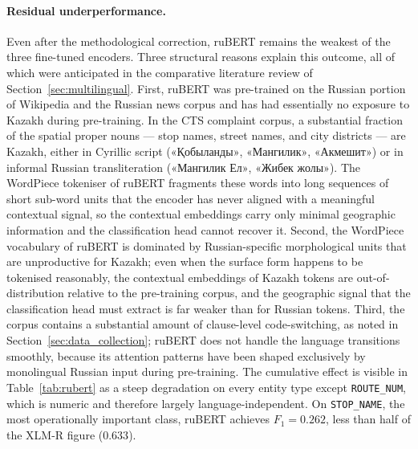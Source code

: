 \paragraph{Residual underperformance.} Even after the methodological correction, ruBERT remains the weakest of the three fine-tuned encoders. Three structural reasons explain this outcome, all of which were anticipated in the comparative literature review of Section~\ref{sec:multilingual}. First, ruBERT was pre-trained on the Russian portion of Wikipedia and the Russian news corpus and has had essentially no exposure to Kazakh during pre-training. In the CTS complaint corpus, a substantial fraction of the spatial proper nouns --- stop names, street names, and city districts --- are Kazakh, either in Cyrillic script (\foreignlanguage{russian}{«Қобыланды»}, \foreignlanguage{russian}{«Мангилик»}, \foreignlanguage{russian}{«Акмешит»}) or in informal Russian transliteration (\foreignlanguage{russian}{«Мангилик Ел»}, \foreignlanguage{russian}{«Жибек жолы»}). The WordPiece tokeniser of ruBERT fragments these words into long sequences of short sub-word units that the encoder has never aligned with a meaningful contextual signal, so the contextual embeddings carry only minimal geographic information and the classification head cannot recover it. Second, the WordPiece vocabulary of ruBERT is dominated by Russian-specific morphological units that are unproductive for Kazakh; even when the surface form happens to be tokenised reasonably, the contextual embeddings of Kazakh tokens are out-of-distribution relative to the pre-training corpus, and the geographic signal that the classification head must extract is far weaker than for Russian tokens. Third, the corpus contains a substantial amount of clause-level code-switching, as noted in Section~\ref{sec:data_collection}; ruBERT does not handle the language transitions smoothly, because its attention patterns have been shaped exclusively by monolingual Russian input during pre-training. The cumulative effect is visible in Table~\ref{tab:rubert} as a steep degradation on every entity type except \texttt{ROUTE\_NUM}, which is numeric and therefore largely language-independent. On \texttt{STOP\_NAME}, the most operationally important class, ruBERT achieves $F_1 = 0.262$, less than half of the XLM-R figure ($0.633$).

